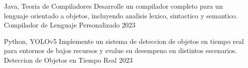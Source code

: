\begin{cvhonors}

  \cvhonor
    {Java, Teoria de Compiladores}
    {Desarrolle un compilador completo para un lenguaje orientado a objetos, incluyendo analisis lexico, sintactico y semantico.}
    {Compilador de Lenguaje Personalizado}
    {2023}

  \cvhonor
    {Python, YOLOv5}
    {Implemente un sistema de deteccion de objetos en tiempo real para entornos de bajos recursos y evalue su desempeno en distintos escenarios.}
    {Deteccion de Objetos en Tiempo Real}
    {2023}

\end{cvhonors}

